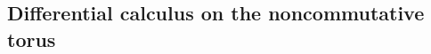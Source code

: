 \documentclass[
    aps,
    prb,
    twocolumn,
    floatfix,
    superscriptaddress,
	10pt
]{revtex4-2}
\begin{document}

\subsection{Differential calculus on the noncommutative torus}
\end{document}
